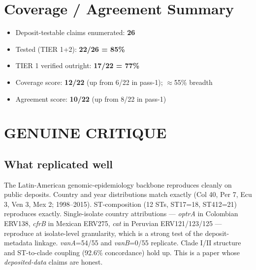 \documentclass[11pt,letterpaper]{article}
\begin{document}
\section{Coverage / Agreement Summary}
\begin{itemize}[leftmargin=1.2em]
  \item Deposit-testable claims enumerated: \textbf{26}
  \item Tested (TIER 1+2): \textbf{22/26 = 85\%}
  \item TIER 1 verified outright: \textbf{17/22 = 77\%}
  \item Coverage score: \textbf{12/22} (up from 6/22 in pass-1); $\approx$55\% breadth
  \item Agreement score: \textbf{10/22} (up from 8/22 in pass-1)
\end{itemize}

\section{GENUINE CRITIQUE}
\subsection{What replicated well}
The Latin-American genomic-epidemiology backbone reproduces cleanly on public deposits. Country and year distributions match exactly (Col 40, Per 7, Ecu 3, Ven 3, Mex 2; 1998--2015). ST-composition (12 STs, ST17=18, ST412=21) reproduces exactly. Single-isolate country attributions --- \emph{optrA} in Colombian ERV138, \emph{cfrB} in Mexican ERV275, \emph{cat} in Peruvian ERV121/123/125 --- reproduce at isolate-level granularity, which is a strong test of the deposit-metadata linkage. \emph{vanA}=54/55 and \emph{vanB}=0/55 replicate. Clade I/II structure and ST-to-clade coupling (92.6\% concordance) hold up. This is a paper whose \emph{deposited-data} claims are honest.
\end{document}
